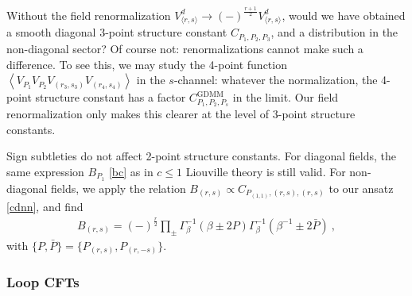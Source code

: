 \documentclass[12pt, a4paper]{article}
\begin{document}
Without the field renormalization $V^d_{\langle r,s\rangle}\to (-)^{\frac{r+1}{2}} V^d_{\langle r,s\rangle}$, would we have obtained a smooth diagonal 3-point structure constant $C_{P_1,P_2,P_3}$, and a distribution in the non-diagonal sector? Of course not: renormalizations cannot make such a difference. To see this, we may study the 4-point function $\left<V_{P_1}V_{P_2}V_{(r_3,s_3)}V_{(r_4,s_4)}\right>$ in the $s$-channel: whatever the normalization, the 4-point structure constant has a factor $C^\text{GDMM}_{P_1,P_2,P_s}$ in the limit. Our field renormalization only makes this clearer at the level of 3-point structure constants. 

Sign subtleties do not affect 2-point structure constants. For diagonal fields, the same expression $B_{P_1}$ \eqref{bc} as in $c\leq 1$ Liouville theory is still valid. For non-diagonal fields, we apply the relation $B_{(r,s)}\propto C_{P_{(1,1)},(r,s),(r,s)}$ to our ansatz \eqref{cdnn}, and find 
\begin{align}
 \boxed{B_{(r,s)} = (-)^\frac{r}{2} \prod_\pm \Gamma_\beta^{-1}\left(\beta\pm 2P\right)\Gamma_\beta^{-1}\left(\beta^{-1}\pm 2\bar P\right)}\ ,
 \label{nbrs}
\end{align}
with $\{P,\bar P\}=\{P_{(r,s)},P_{(r,-s)}\}$.

\subsubsection{Loop CFTs}\label{sec:bcloop}
\end{document}
